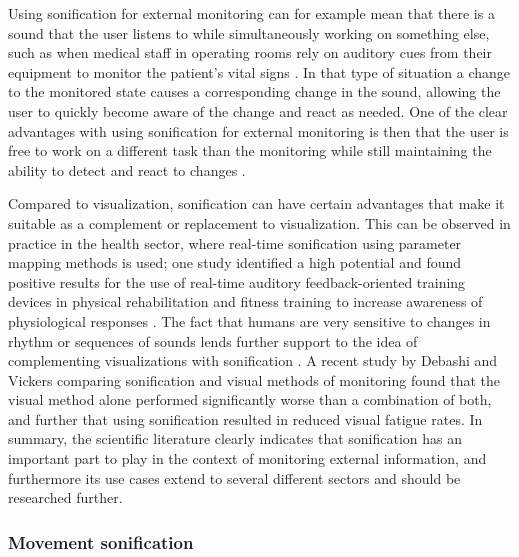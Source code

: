 \documentclass[10pt,a4paper,onecolumn]{article}
\begin{document}
Using sonification for external monitoring can for example mean that there is a sound that the user listens to while simultaneously working on something else, such as when medical staff in operating rooms rely on auditory cues from their equipment to monitor the patient's vital signs \autocite{dubusInteractiveSonificationMotion2013}. In that type of situation a change to the monitored state causes a corresponding change in the sound, allowing the user to quickly become aware of the change and react as needed. One of the clear advantages with using sonification for external monitoring is then that the user is free to work on a different task than the monitoring while still maintaining the ability to detect and react to changes \autocite{vickersSonificationProcessMonitoring}.

Compared to visualization, sonification can have certain advantages that make it suitable as a complement or replacement to visualization. This can be observed in practice in the health sector, where real-time sonification using parameter mapping methods is used; one study identified a high potential and found positive results for the use of real-time auditory feedback-oriented training devices in physical rehabilitation and fitness training to increase awareness of physiological responses \autocite{yangRealtimeSonificationBiceps2015}. The fact that humans are very sensitive to changes in rhythm or sequences of sounds lends further support to the idea of complementing visualizations with sonification \autocite{hildebrandtShortPaperEnhancing2014}. A recent study by Debashi and Vickers \autocite{debashiSonificationNetworkTraffic2018} comparing sonification and visual methods of monitoring found that the visual method alone performed significantly worse than a combination of both, and further that using sonification resulted in reduced visual fatigue rates. In summary, the scientific literature clearly indicates that sonification has an important part to play in the context of monitoring external information, and furthermore its use cases extend to several different sectors and should be researched further.

\hypertarget{movement-sonification}{%
\subsubsection{Movement sonification}\label{movement-sonification}}
\end{document}
